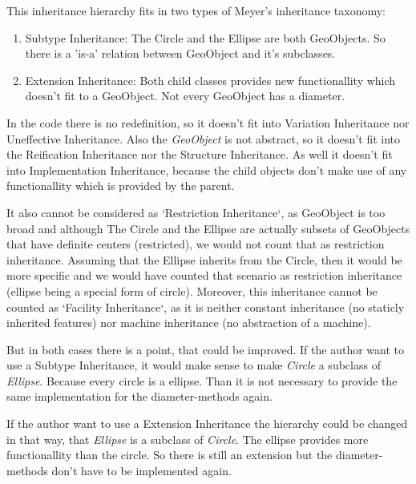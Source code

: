 \documentclass[a4paper,12pt,oneside]{scrreprt}
\begin{document}
    \begin{flushleft}
        This inheritance hierarchy fits in two types of Meyer's inheritance taxonomy:
        \begin{enumerate}
            \item Subtype Inheritance: The Circle and the Ellipse are both GeoObjects. So there is a 'is-a' relation between GeoObject and it's subclasses.
            \item Extension Inheritance: Both child classes provides new functionallity which doesn't fit to a GeoObject. Not every GeoObject has a diameter.
        \end{enumerate}
    
        In the code there is no redefinition, so it doesn't fit into Variation Inheritance nor Uneffective Inheritance. Also the \textit{GeoObject} is not abstract, so it doesn't fit into the Reification Inheritance nor the Structure Inheritance. As well it doesn't fit into Implementation Inheritance, because the child objects don't make use of any functionallity which is provided by the parent.
        
        It also cannot be considered as `Restriction Inheritance`, as GeoObject is too broad and although The Circle and the Ellipse are actually subsets of GeoObjects that have definite centers (restricted), we would not count that as restriction inheritance. Assuming that the Ellipse inherits from the Circle, then it would be more specific and we would have counted that scenario as restriction inheritance (ellipse being a special form of circle). Moreover, this inheritance cannot be counted as `Facility Inheritance`, as it is neither constant inheritance (no staticly inherited features) nor machine inheritance (no abstraction of a machine).
        
        But in both cases there is a point, that could be improved. If the author want to use a Subtype Inheritance, it would make sense to make \textit{Circle} a subclass of \textit{Ellipse}. Because every circle is a ellipse. Than it is not necessary to provide the same implementation for the diameter-methods again.
        
        If the author want to use a Extension Inheritance the hierarchy could be changed in that way, that \textit{Ellipse} is a subclass of \textit{Circle}. The ellipse provides more functionallity than the circle. So there is still an extension but the diameter-methods don't have to be implemented again.
    \end{flushleft}
\end{document}
